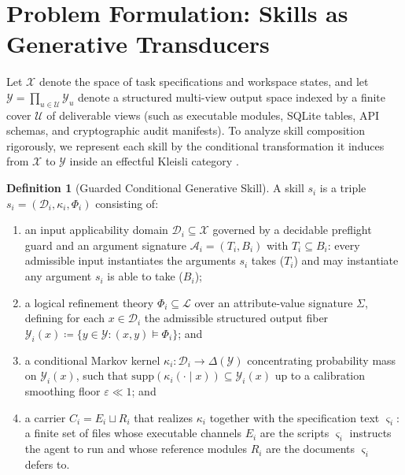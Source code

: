 \documentclass[11pt]{article}
\theoremstyle{definition}
\newtheorem{definition}{Definition}
\theoremstyle{plain}
\newcommand{\Xcal}{\mathcal{X}}
\newcommand{\Ycal}{\mathcal{Y}}
\newcommand{\Ucal}{\mathcal{U}}
\newcommand{\Dcal}{\mathcal{D}}
\newcommand{\Lcal}{\mathcal{L}}
\newcommand{\Acal}{\mathcal{A}}
\begin{document}
\section{Problem Formulation: Skills as Generative Transducers}
\label{sec:problem}

Let $\Xcal$ denote the space of task specifications and workspace states, and let $\Ycal = \prod_{u \in \Ucal} \Ycal_u$ denote a structured multi-view output space indexed by a finite cover $\Ucal$ of deliverable views (such as executable modules, SQLite tables, API schemas, and cryptographic audit manifests). To analyze skill composition rigorously, we represent each skill by the conditional transformation it induces from $\Xcal$ to $\Ycal$ inside an effectful Kleisli category \citep{moggi1991notions}.

\begin{definition}[Guarded Conditional Generative Skill]
\label{def:skill}
A skill $s_i$ is a triple $s_i = (\Dcal_i, \kappa_i, \Phi_i)$ consisting of:
\begin{enumerate}[leftmargin=1.8em,itemsep=1pt,topsep=2pt]
  \item an input applicability domain $\Dcal_i \subseteq \Xcal$ governed by a decidable preflight guard and an argument signature $\Acal_i = (T_i, B_i)$ with $T_i \subseteq B_i$: every admissible input instantiates the arguments $s_i$ takes ($T_i$) and may instantiate any argument $s_i$ is able to take ($B_i$);
  \item a logical refinement theory $\Phi_i \subseteq \Lcal$ over an attribute-value signature $\Sigma$, defining for each $x \in \Dcal_i$ the admissible structured output fiber $\Ycal_i(x) \coloneqq \{y \in \Ycal : (x, y) \models \Phi_i\}$; and
  \item a conditional Markov kernel $\kappa_i : \Dcal_i \to \Delta(\Ycal)$ concentrating probability mass on $\Ycal_i(x)$, such that $\mathrm{supp}(\kappa_i(\cdot \mid x)) \subseteq \Ycal_i(x)$ up to a calibration smoothing floor $\varepsilon \ll 1$; and
  \item a carrier $C_i = E_i \sqcup R_i$ that realizes $\kappa_i$ together with the specification text $\varsigma_i$: a finite set of files whose executable channels $E_i$ are the scripts $\varsigma_i$ instructs the agent to run and whose reference modules $R_i$ are the documents $\varsigma_i$ defers to.
\end{enumerate}
\end{definition}
\end{document}
